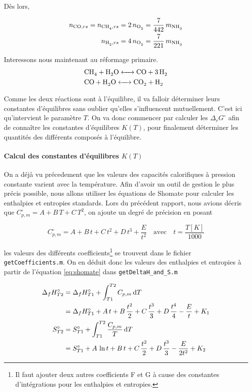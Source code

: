 \documentclass[a4paper, oneside, 12pt]{article}
\begin{document}
Dès lors, 

\begin{align}
	n_{\ce{CO}, rs} = n_{\ce{CH4}, rs} 
	= 2 \, n_{\ce{O2}} = \frac{7}{442} \, m_{\ce{NH3}} 
	\label{eq:moles1_ref_sec} \\
	n_{\ce{H2}, rs} = 4 \, n_{\ce{O2}} = \frac{7}{221} \, m_{\ce{NH3}}
	\label{eq:moles2_ref_sec}
\end{align}

Interessons nous maintenant au réformage primaire.
\begin{align*}
	&\ce{CH4 + H2O <-> CO + 3H2} \\
	&\ce{CO + H2O <-> CO2 + H2}
\end{align*}

Comme les deux réactions sont à l'équilibre,
il va falloir déterminer leurs constantes d'équilibres sans
oublier qu'elles s'influencent mutuellement.
C'est ici qu'intervient le paramètre $T$. On va donc commencer
par calculer les $\Delta_r G^{\circ}$ afin de conna\^itre les constantes
d'équilibres $K(T)$, pour finalement déterminer les quantités des différents composés
à l'équilibre.

\paragraph{Calcul des constantes d'équilibres $K(T)$}

On a déjà vu précedement que les valeurs des capacités calorifiques
à pression constante varient avec la température. Afin d'avoir un outil de gestion
le plus précis possible, nous allons utiliser les équations de Shomate pour calculer 
les enthalpies et entropies standards. 
Lors du précédent rapport, nous avions décris que $C_{p,m}^{\circ} = A + B \, T + C \, T^2$,
on ajoute un degré de précision en posant

\begin{equation}
	C_{p,m}^{\circ} = A + B \, t + C \, t^2 + D \, t^3 + \frac{E}{t^2}
	\quad \text{avec} \quad t = \frac{T[K]}{1000}
	\label{eq:shomate}
\end{equation}

les valeurs des différents coefficients\footnote{Il faut ajouter deux autres 
coefficients F et G à cause des constantes d'intégrations pour les
enthalpies et entropies.} se trouvent \cite{shomate} dans le fichier \texttt{getCoefficients.m}.
On en déduit donc les valeurs des enthalpies et entropies
à partir de l'équation \ref{eq:shomate} dans \texttt{getDeltaH\_and\_S.m}  

\begin{align*}
	\Delta_f H_{T2}^{\circ} &= \Delta_f H_{T1}^{\circ} 
	+ \int_{T1}^{T2} C_{p,m} \, \mathrm{d}T \\ 
				 &= \Delta_f H_{T1}^{\circ} 
	+ A \, t + B \, \frac{t^2}{2}  + C \,  \frac{t^3}{3} 
	+ D \, \frac{t^4}{4} - \frac{E}{t} + K_{1} \\		 
	S_{T2}^{\circ}  &= S_{T1}^{\circ} + \int_{T1}^{T2} 
	\frac{C_{p,m}}{T} \, \mathrm{d}T \\
			&= S_{T1}^{\circ} + A \, \ln{t} 
	+ B \, t + C \, \frac{t^2}{2} 
	+ D \, \frac{t^3}{3} - \frac{E}{2 t^{2}} + K_{2} 
\end{align*}
\end{document}

